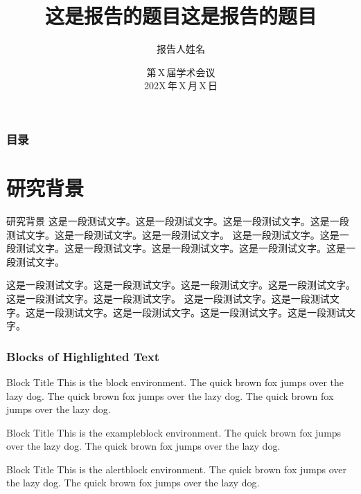 \documentclass[noamsthm,notheorems,11pt,compress]{beamer}
\title[报告题目]{这是报告的题目这是报告的题目}
\author[姓名]{报告人姓名}
\institute[XX大学]{\vskip -10pt
XX\,大学数学系
\vskip 10pt
}
\date[202X\,年\,X\,月\,X\,日]{第\,X\,届学术会议 \\[5pt] 202X\,年\,X\,月\,X\,日 }
\begin{document}
\setlength{\baselineskip}{15pt}


{
\begin{frame}
\titlepage %
\end{frame}}


\begin{frame}
\frametitle{目录}
\tableofcontents
\end{frame}



\section{研究背景}

\begin{frame}{研究背景}
这是一段测试文字。这是一段测试文字。这是一段测试文字。这是一段测试文字。这是一段测试文字。这是一段测试文字。
这是一段测试文字。这是一段测试文字。这是一段测试文字。这是一段测试文字。这是一段测试文字。这是一段测试文字。

\vspace{1ex}
这是一段测试文字。这是一段测试文字。这是一段测试文字。这是一段测试文字。这是一段测试文字。这是一段测试文字。
这是一段测试文字。这是一段测试文字。这是一段测试文字。这是一段测试文字。这是一段测试文字。这是一段测试文字。

\end{frame}


\begin{frame}
\frametitle{Blocks of Highlighted Text}
\begin{block}{Block Title}
This is the block environment. The quick brown fox jumps over the lazy dog. The quick brown fox jumps over the lazy dog. The quick brown fox jumps over the lazy dog.
\end{block}

\begin{exampleblock}{Block Title}
This is the exampleblock environment. The quick brown fox jumps over the lazy dog. The quick brown fox jumps over the lazy dog.
\end{exampleblock}

\begin{alertblock}{Block Title}
This is the alertblock environment. The quick brown fox jumps over the lazy dog. The quick brown fox jumps over the lazy dog.
\end{alertblock}
\end{frame}
\end{document}
